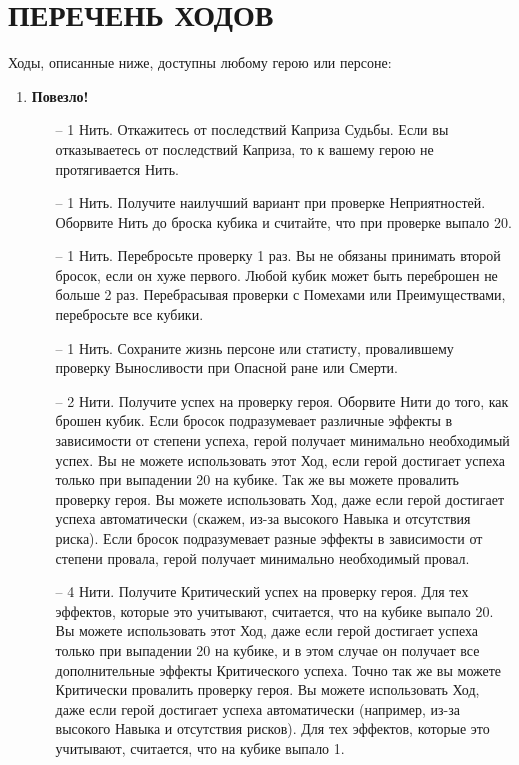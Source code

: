 \section{ПЕРЕЧЕНЬ ХОДОВ}
Ходы, описанные ниже, доступны любому герою или персоне:
\begin{enumerate}
\item \textbf{Повезло!}
\begin{itemize}
\item[--] 1 Нить. Откажитесь от последствий Каприза Судьбы. Если вы отказываетесь от последствий Каприза, то к вашему герою не протягивается Нить.
\item[--] 1 Нить. Получите наилучший вариант при проверке Неприятностей. Оборвите Нить до броска кубика и считайте, что при проверке выпало 20.
\item[--] 1 Нить. Перебросьте проверку 1 раз. Вы не обязаны принимать второй бросок, если он хуже первого. Любой кубик может быть переброшен не больше 2 раз. Перебрасывая проверки с Помехами или Преимуществами, перебросьте все кубики.
\item[--] 1 Нить. Сохраните жизнь персоне или статисту, провалившему проверку Выносливости при Опасной ране или Смерти.
\item[--] 2 Нити. Получите успех на проверку героя. Оборвите Нити до того, как брошен кубик. Если бросок подразумевает различные эффекты в зависимости от степени успеха, герой получает минимально необходимый успех. Вы не можете использовать этот Ход, если герой достигает успеха только при выпадении 20 на кубике.
Так же вы можете провалить проверку героя. Вы можете использовать Ход, даже если герой достигает успеха автоматически (скажем, из-за высокого Навыка и отсутствия риска). Если бросок подразумевает разные эффекты в зависимости от степени провала, герой получает минимально необходимый провал.
\item[--] 4 Нити. Получите Критический успех на проверку героя. Для тех эффектов, которые это учитывают, считается, что на кубике выпало 20. Вы можете использовать этот Ход, даже если герой достигает успеха только при выпадении 20 на кубике, и в этом случае он получает все дополнительные эффекты Критического успеха.
Точно так же вы можете Критически провалить проверку героя. Вы можете использовать Ход, даже если герой достигает успеха автоматически (например, из-за высокого Навыка и отсутствия рисков). Для тех эффектов, которые это учитывают, считается, что на кубике выпало 1.
\end{itemize}


\end{enumerate}
